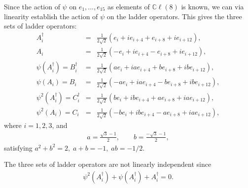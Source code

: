 \documentclass{article}
\newcommand{\bb}[1]{\mathbb{#1}}
\begin{document}
Since the action of $\psi$ on $e_1,...,e_{15}$ as elements of $\bb{C}\ell(8)$ is known, we can via linearity establish the action of $\psi$ on the ladder operators. This gives the three sets of ladder operators: 
\begin{eqnarray}
    A_i^{\dagger}&=&\frac{1}{2\sqrt{2}}(e_i+ie_{i+4}+e_{i+8}+ie_{i+12}),\\
    A_i&=&\frac{1}{2\sqrt{2}}(-e_i+ie_{i+4}-e_{i+8}+ie_{i+12}),\\
    \psi(A_i^{\dagger})=B_i^{\dagger}&=&\frac{1}{2\sqrt{2}}(ae_i+iae_{i+4}+be_{i+8}+ibe_{i+12}),\\
    \psi(A_i)=B_i&=&\frac{1}{2\sqrt{2}}(-ae_i+iae_{i+4}-be_{i+8}+ibe_{i+12}),\\
    \psi^2(A_i^{\dagger})=C_i^{\dagger}&=&\frac{1}{2\sqrt{2}}(be_i+ibe_{i+4}+ae_{i+8}+iae_{i+12}),\\
    \psi^2(A_i)=C_i&=&\frac{1}{2\sqrt{2}}(-be_i+ibe_{i+4}-ae_{i+8}+iae_{i+12}),
\end{eqnarray}
where $i=1,2,3$, and
\begin{eqnarray}
    a=\frac{\sqrt{3}-1}{2},\qquad b=\frac{-\sqrt{3}-1}{2},
\end{eqnarray}
satisfying $a^2+b^2=2,\; a+b=-1,\; ab=-1/2$.

The three sets of ladder operators are not linearly independent since
\begin{eqnarray}\label{conditionladder}
    \psi^2(A_i^{\dagger})+\psi(A_i^{\dagger})+A_i^{\dagger}=0.
\end{eqnarray}
\end{document}

